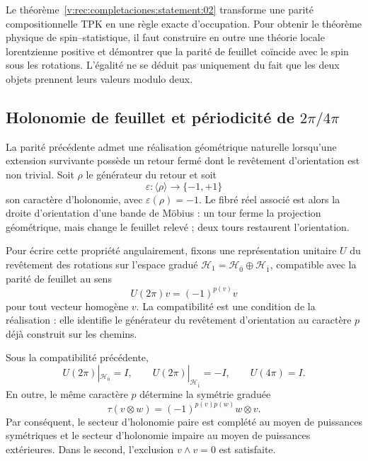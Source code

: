 Le théorème~\ref{v:rec:completaciones:statement:02} transforme une parité compositionnelle TPK en une règle exacte
d’occupation. Pour obtenir le théorème physique de spin--statistique, il faut
construire en outre une théorie locale lorentzienne positive et démontrer que la
parité de feuillet coïncide avec le spin sous les rotations. L’égalité ne se
déduit pas uniquement du fait que les deux objets prennent leurs valeurs modulo deux.

\subsection{Holonomie de feuillet et périodicité de \texorpdfstring{\(2\pi/4\pi\)}{2pi/4pi}}
\label{v:rec:completaciones:section:05}

La parité précédente admet une réalisation géométrique naturelle lorsqu’une
extension survivante possède un retour fermé dont le revêtement d’orientation
est non trivial. Soit \(\rho\) le générateur du retour et soit
\[
 \varepsilon:\langle\rho\rangle\longrightarrow\{-1,+1\}
\]
son caractère d’holonomie, avec \(\varepsilon(\rho)=-1\). Le fibré réel
associé est alors la droite d’orientation d’une bande de Möbius : un
tour ferme la projection géométrique, mais change le feuillet relevé ; deux
tours restaurent l’orientation.

Pour écrire cette propriété angulairement, fixons une représentation
unitaire \(U\) du revêtement des rotations sur l’espace gradué
\(\mathcal H_1=\mathcal H_{\bar0}\oplus\mathcal H_{\bar1}\), compatible avec
la parité de feuillet au sens
\[
 U(2\pi)v=(-1)^{p(v)}v
\]
pour tout vecteur homogène \(v\). La compatibilité est une condition de la
réalisation : elle identifie le générateur du revêtement d’orientation au
caractère \(p\) déjà construit sur les chemins.

\begin{theorem}
\label{v:rec:thm:dos-cuatro-pi-estadistica}
Sous la compatibilité précédente,
\[
 U(2\pi)|_{\mathcal H_{\bar0}}=I,
 \qquad
 U(2\pi)|_{\mathcal H_{\bar1}}=-I,
 \qquad
 U(4\pi)=I.
\]
En outre, le même caractère \(p\) détermine la symétrie graduée
\[
 \tau(v\otimes w)=(-1)^{p(v)p(w)}w\otimes v.
\]
Par conséquent, le secteur d’holonomie paire est complété au moyen de puissances
symétriques et le secteur d’holonomie impaire au moyen de puissances extérieures. Dans
le second, l’exclusion \(v\wedge v=0\) est satisfaite.
\end{theorem}

